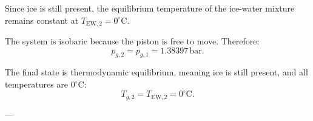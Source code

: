 Since ice is still present, the equilibrium temperature of the ice-water mixture remains constant at \( T_{\text{EW},2} = 0^\circ\text{C} \).  

The system is isobaric because the piston is free to move. Therefore:  
\[
p_{g,2} = p_{g,1} = 1.38397 \, \text{bar}.
\]  

The final state is thermodynamic equilibrium, meaning ice is still present, and all temperatures are \( 0^\circ\text{C} \):  
\[
T_{g,2} = T_{\text{EW},2} = 0^\circ\text{C}.
\]  

---
